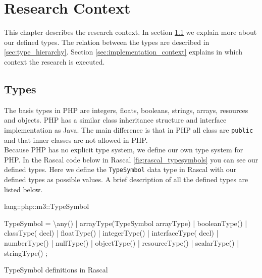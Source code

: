 \documentclass[../main.tex]{subfiles}
\begin{document}
    \chapter{Research Context}\label{ch:inference_design_context}

	This chapter describes the research context.
    In section \ref{sec:types} we explain more about our defined types.
    The relation between the types are described in \ref{sec:type_hierarchy}.
    Section \ref{sec:implementation_context} explains in which context the research is executed.
    
	\section{Types}\label{sec:types}
	The basis types in PHP are integers, floats, booleans, strings, arrays, resources and objects.
	PHP has a similar class inheritance structure and interface implementation as Java.
    The main difference is that in PHP all class are \texttt{public} and that inner classes are not allowed in PHP. 
    \\
	Because PHP has no explicit type system, we define our own type system for PHP.
	In the Rascal code below in Rascal \ref{fig:rascal_typesymbols} you can see our defined types.
	Here we define the \texttt{TypeSymbol} data type in Rascal with our defined types as possible values.
	A brief description of all the defined types are listed below.
	\begin{program}
    \begin{rascal}
 lang::php::m3::TypeSymbol
 
 TypeSymbol
  = \textbackslash{}any()\footnotemark                         {}
  | arrayType(TypeSymbol arrayType) 
  | booleanType()                   
  | classType( decl)             
  | floatType()                     
  | integerType()                   
  | interfaceType( decl)         
  | numberType()                    
  | nullType()                      
  | objectType()                    
  | resourceType()                  
  | scalarType()                    
  | stringType()                    
  ; 
    \end{rascal}
	\caption{TypeSymbol definitions in Rascal}
	\label{fig:rascal_typesymbols}
	\end{program} 
    
\end{document}
